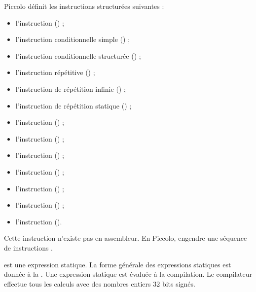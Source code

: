 Piccolo définit les instructions structurées suivantes :
\begin{itemize}
  \item l'instruction  () ;
  \item l'instruction conditionnelle simple () ;
  \item l'instruction conditionnelle structurée () ;
  \item l'instruction répétitive () ;
  \item l'instruction de répétition infinie () ;
  \item l'instruction de répétition statique () ;
  \item l'instruction  () ;
  \item l'instruction  () ;
  \item l'instruction  () ;
  \item l'instruction  () ;
  \item l'instruction  () ;
  \item l'instruction  () ;
  \item l'instruction  ().
\end{itemize}


Cette instruction n'existe pas en assembleur. En Piccolo,  engendre une séquence de  instructions .

 est une expression statique. La forme générale des expressions statiques est donnée à la . Une expression statique est évaluée à la compilation. Le compilateur effectue tous les calculs avec des nombres entiers 32 bits signés.






